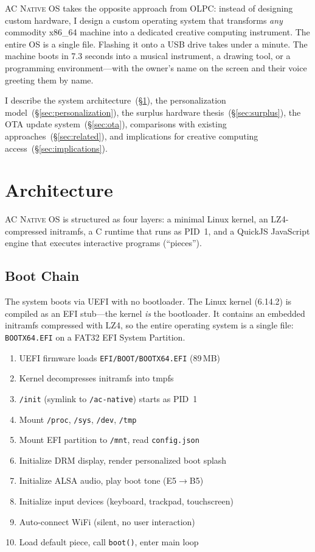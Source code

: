 \documentclass[10pt,letterpaper,twocolumn]{article}
\newcommand{\acos}{\textsc{AC Native OS}}
\begin{document}
\acos{} takes the opposite approach from OLPC: instead of designing custom hardware, I design a custom operating system that transforms \emph{any} commodity x86\_64 machine into a dedicated creative computing instrument. The entire OS is a single file. Flashing it onto a USB drive takes under a minute. The machine boots in 7.3 seconds into a musical instrument, a drawing tool, or a programming environment---with the owner's name on the screen and their voice greeting them by name.

I describe the system architecture~(\S\ref{sec:architecture}), the personalization model~(\S\ref{sec:personalization}), the surplus hardware thesis~(\S\ref{sec:surplus}), the OTA update system~(\S\ref{sec:ota}), comparisons with existing approaches~(\S\ref{sec:related}), and implications for creative computing access~(\S\ref{sec:implications}).


\section{Architecture}
\label{sec:architecture}

\acos{} is structured as four layers: a minimal Linux kernel, an LZ4-compressed initramfs, a C runtime that runs as PID~1, and a QuickJS JavaScript engine that executes interactive programs (``pieces'').

\subsection{Boot Chain}

The system boots via UEFI with no bootloader. The Linux kernel (6.14.2) is compiled as an EFI stub---the kernel \emph{is} the bootloader. It contains an embedded initramfs compressed with LZ4, so the entire operating system is a single file: \texttt{BOOTX64.EFI} on a FAT32 EFI System Partition.

\begin{enumerate}
  \item UEFI firmware loads \texttt{EFI/BOOT/BOOTX64.EFI} (89\,MB)
  \item Kernel decompresses initramfs into tmpfs
  \item \texttt{/init} (symlink to \texttt{/ac-native}) starts as PID~1
  \item Mount \texttt{/proc}, \texttt{/sys}, \texttt{/dev}, \texttt{/tmp}
  \item Mount EFI partition to \texttt{/mnt}, read \texttt{config.json}
  \item Initialize DRM display, render personalized boot splash
  \item Initialize ALSA audio, play boot tone (E5$\rightarrow$B5)
  \item Initialize input devices (keyboard, trackpad, touchscreen)
  \item Auto-connect WiFi (silent, no user interaction)
  \item Load default piece, call \texttt{boot()}, enter main loop
\end{enumerate}
\end{document}
